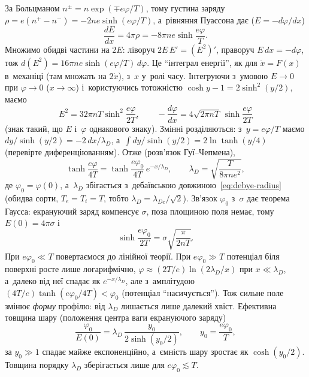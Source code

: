 За Больцманом $n^{\pm}=n\exp(\mp e\varphi/T)$, тому густина заряду
$\rho=e(n^+-n^-)=-2ne\sinh(e\varphi/T)$, а~рівняння Пуассона дає ($E=-d\varphi/dx$)
\begin{equation*}
	\frac{dE}{dx}=4\pi\rho=-8\pi ne\sinh\frac{e\varphi}{T}.
\end{equation*}
Множимо обидві частини на $2E$: ліворуч $2E\,E'=(E^2)'$, праворуч $E\,dx=-d\varphi$, тож
$d(E^2)=16\pi ne\sinh(e\varphi/T)\,d\varphi$. Це \enquote{інтеграл енергії}, як для $\ddot x=F(x)$
в~механіці (там множать на $2\dot x$), з~$x$ у~ролі часу. Інтегруючи з~умовою $E\to0$ при $\varphi\to0$
($x\to\infty$) і~користуючись тотожністю $\cosh y-1=2\sinh^2(y/2)$, маємо
\begin{equation*}
	E^2=32\pi nT\sinh^2\frac{e\varphi}{2T},\qquad
	-\frac{d\varphi}{dx}=4\sqrt{2\pi nT}\,\sinh\frac{e\varphi}{2T}
\end{equation*}
(знак такий, що $E$ і~$\varphi$ однакового знаку). Змінні розділяються:
з~$y=e\varphi/T$ маємо $dy/\sinh(y/2)=-2\,dx/\lambda_D$, а~$\int dy/\sinh(y/2)=2\ln\tanh(y/4)$
(перевірте диференціюванням). Отже (розв'язок Гуї--Чепмена),
\begin{equation}\label{eq:gouy-chapman}
	\tanh\frac{e\varphi}{4T}=\tanh\frac{e\varphi_0}{4T}\,e^{-x/\lambda_D},\qquad
	\lambda_D=\sqrt{\frac{T}{8\pi ne^2}},
\end{equation}
де $\varphi_0=\varphi(0)$, а~$\lambda_D$ збігається з~дебаївською
довжиною~\eqref{eq:debye-radius} (обидва сорти, $T_e=T_i=T$, тобто $\lambda_D=\lambda_{De}/\sqrt2$).
Зв'язок $\varphi_0$ з~$\sigma$ дає теорема Гаусса: екрануючий заряд компенсує $\sigma$,
поза площиною поля немає, тому $E(0)=4\pi\sigma$ і
\begin{equation*}
	\sinh\frac{e\varphi_0}{2T}=\sigma\sqrt{\frac{\pi}{2nT}}.
\end{equation*}
При $e\varphi_0\ll T$ повертаємося до лінійної теорії. При $e\varphi_0\gg T$ потенціал біля
поверхні росте лише логарифмічно, $\varphi\approx(2T/e)\ln(2\lambda_D/x)$ при $x\ll\lambda_D$, а~далеко
від неї спадає як $e^{-x/\lambda_D}$, але з~амплітудою $(4T/e)\tanh(e\varphi_0/4T)<\varphi_0$ (потенціал
\enquote{насичується}). Тож сильне поле змінює \emph{форму} профілю: від $\lambda_D$ лишається лише далекий
хвіст. Ефективна товщина шару (положення центра ваги екрануючого заряду)
\begin{equation*}
	\frac{\varphi_0}{E(0)}=\lambda_D\,\frac{y_0}{2\sinh(y_0/2)},\qquad y_0=\frac{e\varphi_0}T,
\end{equation*}
за $y_0\gg1$ спадає майже експоненційно, а~ємність шару зростає як $\cosh(y_0/2)$.
Товщина порядку $\lambda_D$ зберігається лише для $e\varphi_0\lesssim T$.

